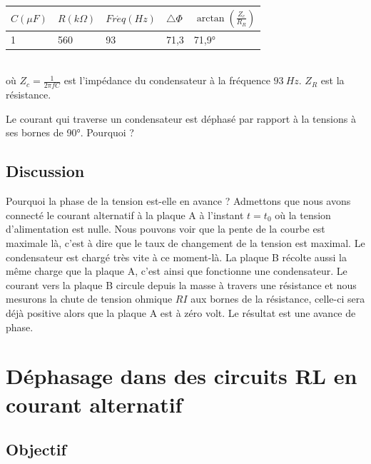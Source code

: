 \documentclass{book}
\begin{document}
\begin{tabular}{|l|l|l|l|l|}
\hline
$C (\mu F)$&$R (k\Omega )$&$Fr\acute eq (Hz)$&$\bigtriangleup\Phi$&$\arctan\left(\frac{Z_{c} }{R_{R} }\right)$
\\ \hline
1&560&93&71,3&71,9°
\\ \hline
\end{tabular}\\[0.5em]
où $Z_{c}=\frac{1}{2\pi fC}$  est l'impédance du condensateur à la fréquence
$93\ Hz$.
$Z_{R}$  est la résistance.



Le courant qui traverse un condensateur est déphasé par rapport à la tensions à ses bornes de 90°. Pourquoi ?

\subsection{Discussion}


Pourquoi la phase de la tension est-elle en avance ? Admettons que nous avons connecté le courant alternatif à la plaque A à l'instant $t=t_{0}$  où la tension d'alimentation est nulle. Nous pouvons voir que la pente de la courbe est maximale là, c'est à dire que le taux de changement de la tension est maximal. Le condensateur est chargé très vite à ce moment-là. La plaque B récolte aussi la même charge que la plaque A, c'est ainsi que fonctionne une condensateur. Le courant vers la plaque B circule depuis la masse à travers une résistance et nous mesurons la chute de tension ohmique $RI$ aux bornes de la résistance, celle-ci sera déjà positive alors que la plaque A est à zéro volt. Le résultat est une avance de phase.







\section{Déphasage dans des circuits RL en courant alternatif}


 \label{sec:Inductor-in-AC}

\subsection{Objectif}
\end{document}
